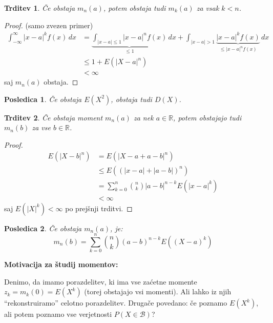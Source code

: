 \documentclass[12pt]{book}
\def\n{\noindent}
\theoremstyle{definition}
\theoremstyle{plain}
\theoremstyle{plain}
\newtheorem{trditev}{Trditev}
\theoremstyle{plain}
\theoremstyle{plain}
\newtheorem{posledica}{Posledica}
\theoremstyle{remark}
\begin{document}
\begin{trditev}
    Če obstaja $m_n(a)$, potem obstaja tudi $m_k(a)$ za vsak $k<n$.
\end{trditev}

\begin{proof}(samo zvezen primer)
    \begin{align*}
        \int_{-\infty}^{\infty}|x-a|^k f(x) \, d x&=\underbrace{\int_{|x-a| \leq 1}|x-a|^n f(x)}_{\leq 1} \, d x+\int_{|x-a|>1}\underbrace{|x-a|^k f(x)}_{\leq |x-a|^n f(x)} \, d x \\
        &\leq 1+E\left(|X-a|^n\right) \\
        & <\infty
    \end{align*}
    saj $m_n(a)$ obstaja.
\end{proof}

\begin{posledica}
    Če obstaja $E\left(X^2\right)$, obstaja tudi $D(X)$.
\end{posledica}

\begin{trditev}
    Če obstaja moment $m_n(a)$ za nek $a \in \mathbb{R}$, potem obstajajo tudi $m_n(b)$ za vse $b \in \mathbb{R}$.
\end{trditev}

\begin{proof}
    \begin{align*}
        E\left(|X-b|^n\right)&=E\left(|X-a+a-b|^n\right) \\
        &\leq E\left(\left( | x-a|+|a-b|\right)^n\right) \\
        &=\sum_{k=0}^n\binom{n}{k}|a-b|^{n-k} E \left(| x-a|^k\right) \\
        &<\infty
    \end{align*}
    saj $E\left(|X|^k\right) < \infty$ po prejšnji trditvi.
\end{proof}

\begin{posledica}
    Če obstaja $m_n(a)$, je:
    $$
    m_n(b)=\sum_{k=0}^n\binom{n}{k}(a-b)^{n-k} E\left((X-a)^k\right)
    $$
\end{posledica}

\n \textbf{Motivacija za študij momentov:}

\n Denimo, da imamo porazdelitev, ki ima vse zaćetne momente $z_k=m_k(0)=E\left(X^k\right)$ (torej obstajajo vsi momenti). Ali lahko iz njih “rekonstruiramo” celotno porazdelitev. Drugače povedano: če poznamo $E\left(X^k\right)$, ali potem poznamo vse verjetnosti $P(X \in \mathcal{B})$?   
\end{document}
